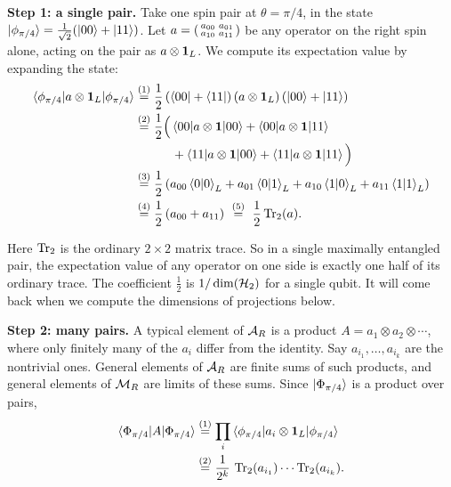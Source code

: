 \textbf{Step 1: a single pair.} Take one spin pair at $\theta=\pi/4$, in the state
$\ket{\phi_{\pi/4}}=\tfrac1{\sqrt2}(\ket{00}+\ket{11})$. Let
$a = \begin{psmallmatrix} a_{00} & a_{01} \\ a_{10} & a_{11} \end{psmallmatrix}$ be any operator on the right
spin alone, acting on the pair as $a\otimes\mathbf{1}_L$. We compute its expectation value by expanding the state:
\begin{align}
\braket{\phi_{\pi/4}|a\otimes\id_L|\phi_{\pi/4}}
&\eqstep{1} \frac{1}{2}\left(\bra{00}+\bra{11}\right)(a\otimes\id_L)\left(\ket{00}+\ket{11}\right) \notag\\
&\eqstep{2} \frac{1}{2}\Big( \braket{00|a\otimes\id|00} + \braket{00|a\otimes\id|11} \notag\\
&\qquad\quad + \braket{11|a\otimes\id|00} + \braket{11|a\otimes\id|11} \Big) \notag\\
&\eqstep{3} \frac{1}{2}\left( a_{00}\braket{0|0}_L + a_{01}\braket{0|1}_L + a_{10}\braket{1|0}_L
+ a_{11}\braket{1|1}_L \right) \notag\\
&\eqstep{4} \frac{1}{2}\left( a_{00} + a_{11} \right) \ \eqstep{5}\ \frac{1}{2}\Tr_2(a) .
\label{eq:typeII-single-pair}
\end{align}
\quad
{}\quad
{}\quad
{}\quad
{}

Here $\operatorname{Tr}_2$ is the ordinary $2\times2$ matrix trace. So in a single maximally entangled pair, the expectation
value of any operator on one side is exactly one half of its ordinary trace. The coefficient $\tfrac12$ is
$1/\dim(\mathcal{H}_2)$ for a single qubit. It will come back when we compute the dimensions of projections below.

\textbf{Step 2: many pairs.} A typical element of $\mathcal{A}_R$ is a product $A=a_1\otimes a_2\otimes\cdots$, where
only finitely many of the $a_i$ differ from the identity. Say $a_{i_1},\dots, a_{i_k}$ are the nontrivial ones.
General elements of $\mathcal{A}_R$ are finite sums of such products, and general elements of $\mathcal{M}_R$ are limits of
these sums. Since $\ket{\Phi_{\pi/4}}$ is a product over pairs,
\begin{align}
\braket{\Phi_{\pi/4}|A|\Phi_{\pi/4}}
&\overset{(1)}{=} \prod_{i}\braket{\phi_{\pi/4}|a_i\otimes\mathbf{1}_L|\phi_{\pi/4}} \notag\\
&\overset{(2)}{=} \frac{1}{2^k}\,\operatorname{Tr}_2(a_{i_1})\cdots\operatorname{Tr}_2(a_{i_k}) .
\label{eq:typeII-many-pairs}
\end{align}
\quad
{}

